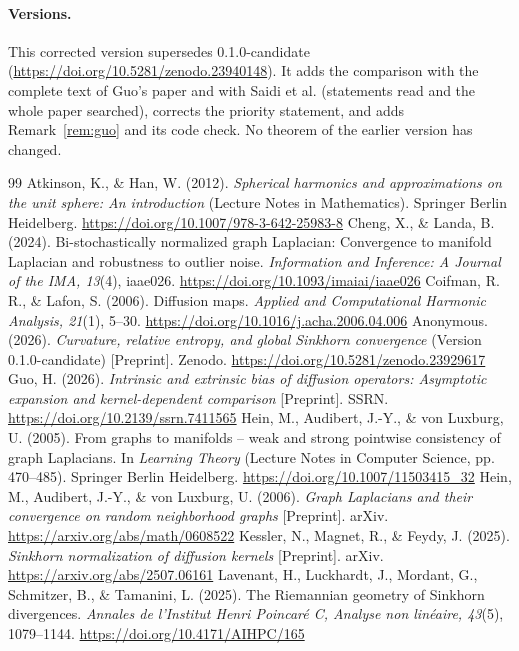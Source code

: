 \documentclass[11pt,a4paper]{article}
\theoremstyle{definition}\newtheorem{definition}[theorem]{Definition}
\theoremstyle{remark}\newtheorem{remark}[theorem]{Remark}
\begin{document}
\paragraph{Versions.} This corrected version supersedes 0.1.0-candidate (\url{https://doi.org/10.5281/zenodo.23940148}). It adds the comparison with the complete text of Guo's paper and with Saidi et al. (statements read and the whole paper searched), corrects the priority statement, and adds Remark~\ref{rem:guo} and its code check. No theorem of the earlier version has changed.

\begin{thebibliography}{99}
\small\setlength{\itemsep}{3pt}
 Atkinson, K., \& Han, W. (2012). \emph{Spherical harmonics and approximations on the unit sphere: An introduction} (Lecture Notes in Mathematics). Springer Berlin Heidelberg. \url{https://doi.org/10.1007/978-3-642-25983-8}
 Cheng, X., \& Landa, B. (2024). Bi-stochastically normalized graph Laplacian: Convergence to manifold Laplacian and robustness to outlier noise. \emph{Information and Inference: A Journal of the IMA, 13}(4), iaae026. \url{https://doi.org/10.1093/imaiai/iaae026}
 Coifman, R. R., \& Lafon, S. (2006). Diffusion maps. \emph{Applied and Computational Harmonic Analysis, 21}(1), 5--30. \url{https://doi.org/10.1016/j.acha.2006.04.006}
 Anonymous. (2026). \emph{Curvature, relative entropy, and global Sinkhorn convergence} (Version 0.1.0-candidate) [Preprint]. Zenodo. \url{https://doi.org/10.5281/zenodo.23929617}
 Guo, H. (2026). \emph{Intrinsic and extrinsic bias of diffusion operators: Asymptotic expansion and kernel-dependent comparison} [Preprint]. SSRN. \url{https://doi.org/10.2139/ssrn.7411565}
 Hein, M., Audibert, J.-Y., \& von Luxburg, U. (2005). From graphs to manifolds -- weak and strong pointwise consistency of graph Laplacians. In \emph{Learning Theory} (Lecture Notes in Computer Science, pp. 470--485). Springer Berlin Heidelberg. \url{https://doi.org/10.1007/11503415_32}
 Hein, M., Audibert, J.-Y., \& von Luxburg, U. (2006). \emph{Graph Laplacians and their convergence on random neighborhood graphs} [Preprint]. arXiv. \url{https://arxiv.org/abs/math/0608522}
 Kessler, N., Magnet, R., \& Feydy, J. (2025). \emph{Sinkhorn normalization of diffusion kernels} [Preprint]. arXiv. \url{https://arxiv.org/abs/2507.06161}
 Lavenant, H., Luckhardt, J., Mordant, G., Schmitzer, B., \& Tamanini, L. (2025). The Riemannian geometry of Sinkhorn divergences. \emph{Annales de l'Institut Henri Poincar\'e C, Analyse non lin\'eaire, 43}(5), 1079--1144. \url{https://doi.org/10.4171/AIHPC/165}

\end{thebibliography}
\end{document}
